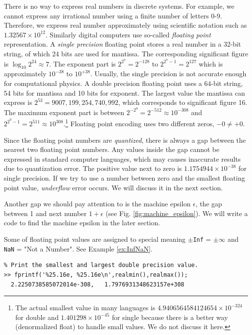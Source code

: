 There is no way to express real numbers in discrete systems. For example, we cannot express any irrational number using a finite number of letters 0-9.  Therefore, we express real number approximately using scientific notation such as $1.32567 \times 10^{12}$.  Similarly digital computers use so-called \emph{floating point} representation.  A \emph{single precision} floating point stores a real number in a 32-bit string, of which 24 bits are used for mantissa.  The corresponding significant figure is $\log_{10} 2^{24} \approx 7$.  The exponent part is $2^{2^7}=2^{-128}$ to $2^{2^7-1}=2^{127}$ which is approximately $10^{-38}$ to $10^{+38}$.  Usually, the single precision is not accurate enough for computational physics. A double precision floating point uses a 64-bit string, 54 bits for mantissa and 10 bits for exponent.  The largest value the mantissa can express  is $2^{53} = 9007,199,254,740,992$, which corresponds to significant figure 16.  The maximum exponent part is between $2^{-2^9} = 2^{-512} \approx 10^{-308}$ and $2^{2^9-1} = 2^{511} \approx 10^{308}$.\footnote{The actual smallest value in many languages is $4.9406564584124654 \times 10^{-324}$ for double and $1.401298 \times 10^{-45}$ for single because there is a better way (denormalized float) to handle small values.  We do not discuss it here.}   Floating point encoding uses two different zeros, $-0 \ne +0$.

Since the floating point numbers are \emph{quantized}, there is always a gap between the nearest two floating point numbers.  Any values inside the gap cannot be expressed in standard computer languages, which may causes inaccurate results due to quantization error.\cite{widrow2008}  The positive value next to zero is $1.1754944 \times 10^{-38}$ for single precision.  If we try to use a number between zero and the smallest floating point value, \textit{underflow} error occurs.   We will discuss it in the next section. 

Another gap we should pay attention to is the machine epsilon $\epsilon$, the gap between 1 and next number $1+\epsilon$ (see Fig. \ref{fig:machine_epsilon}).  We will write a code to find the machine epsilon in the later section.

Some of floating point values are assigned to special meaning $\pm$\texttt{Inf} = $\pm \infty$ and \texttt{NaN} = "Not a Number". See Example \ref{ex:InfNaN}.


\bigskip
\begin{example}
\small
\begin{mybox}
	\begin{verbatim}
% Print the smallest and largest double precision value.
>> fprintf('%25.16e, %25.16e\n',realmin(),realmax());   
  2.2250738585072014e-308,   1.7976931348623157e+308
\end{verbatim}
\end{mybox}
\normalsize
\end{example}

